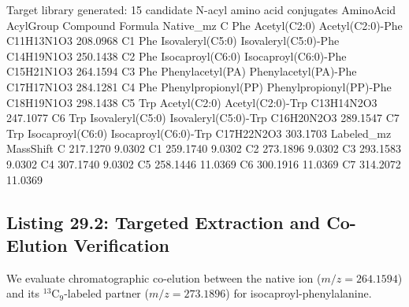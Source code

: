 \documentclass[11pt,twoside,openright]{book}
\begin{document}
\begin{routput}
Target library generated: 15 candidate N-acyl amino acid conjugates
   AminoAcid           AcylGroup                Compound    Formula Native\_mz
C        Phe        Acetyl(C2:0)        Acetyl(C2:0)-Phe C11H13N1O3  208.0968
C1       Phe    Isovaleryl(C5:0)    Isovaleryl(C5:0)-Phe C14H19N1O3  250.1438
C2       Phe    Isocaproyl(C6:0)    Isocaproyl(C6:0)-Phe C15H21N1O3  264.1594
C3       Phe    Phenylacetyl(PA)    Phenylacetyl(PA)-Phe C17H17N1O3  284.1281
C4       Phe Phenylpropionyl(PP) Phenylpropionyl(PP)-Phe C18H19N1O3  298.1438
C5       Trp        Acetyl(C2:0)        Acetyl(C2:0)-Trp C13H14N2O3  247.1077
C6       Trp    Isovaleryl(C5:0)    Isovaleryl(C5:0)-Trp C16H20N2O3  289.1547
C7       Trp    Isocaproyl(C6:0)    Isocaproyl(C6:0)-Trp C17H22N2O3  303.1703
   Labeled\_mz MassShift
C    217.1270    9.0302
C1   259.1740    9.0302
C2   273.1896    9.0302
C3   293.1583    9.0302
C4   307.1740    9.0302
C5   258.1446   11.0369
C6   300.1916   11.0369
C7   314.2072   11.0369
\end{routput}

\subsection{Listing 29.2: Targeted Extraction and Co-Elution Verification}

We evaluate chromatographic co-elution between the native ion ($m/z = 264.1594$) and its $^{13}\text{C}_9$-labeled partner ($m/z = 273.1896$) for isocaproyl-phenylalanine.

\end{document}
